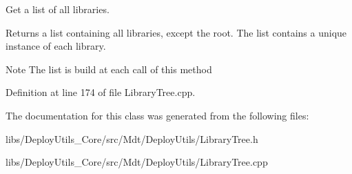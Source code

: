 Get a list of all libraries. 

Returns a list containing all libraries, except the root. The list contains a unique instance of each library.

\begin{DoxyNote}{Note}
The list is build at each call of this method 
\end{DoxyNote}


Definition at line 174 of file Library\+Tree.\+cpp.



The documentation for this class was generated from the following files\+:\begin{DoxyCompactItemize}
\item 
libs/\+Deploy\+Utils\+\_\+\+Core/src/\+Mdt/\+Deploy\+Utils/Library\+Tree.\+h\item 
libs/\+Deploy\+Utils\+\_\+\+Core/src/\+Mdt/\+Deploy\+Utils/Library\+Tree.\+cpp\end{DoxyCompactItemize}
